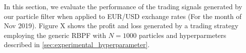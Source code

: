 \documentclass[../main.tex]{subfiles}
\begin{document}
	
In this section, we evaluate the performance of the trading signals generated by our particle filter when applied to EUR/USD exchange rates (For the month of Nov 2019). Figure X shows the profit and loss generated by a trading strategy employing the generic RBPF with $N=1000$ particles and hyperparmeters described in \autoref{sec:experimental_hyperparameter}.
	
	
\end{document}
